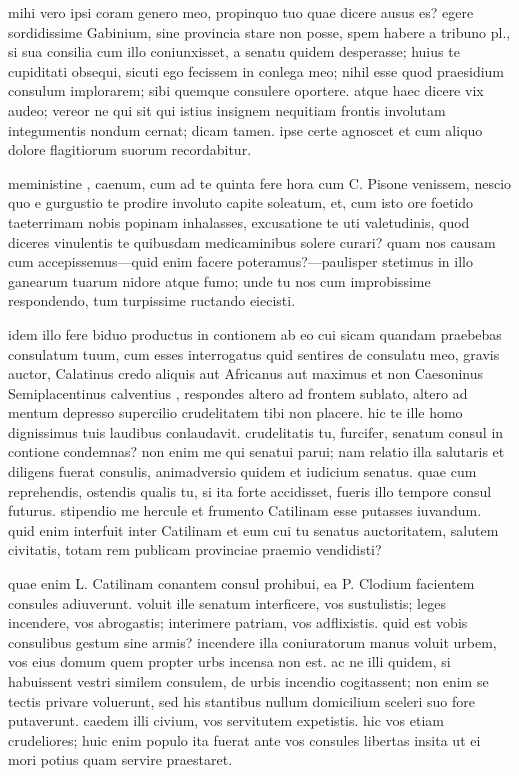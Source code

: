  mihi vero ipsi coram genero meo, propinquo tuo quae dicere ausus es? egere sordidissime Gabinium, sine provincia stare non posse, spem habere a tribuno pl., si sua consilia cum illo coniunxisset, a senatu quidem desperasse; huius te cupiditati obsequi, sicuti ego fecissem in conlega meo; nihil esse quod praesidium consulum implorarem; sibi quemque consulere oportere. atque haec dicere vix audeo; vereor ne qui sit qui istius insignem nequitiam frontis involutam integumentis nondum cernat; dicam tamen. ipse certe agnoscet et cum aliquo dolore flagitiorum suorum recordabitur.

 meministine , caenum, cum ad te quinta fere hora cum C. Pisone venissem, nescio quo e gurgustio te prodire involuto capite soleatum, et, cum isto ore foetido taeterrimam nobis popinam inhalasses, excusatione te uti valetudinis, quod diceres vinulentis te quibusdam medicaminibus solere curari? quam nos causam cum accepissemus—quid enim facere poteramus?—paulisper stetimus in illo ganearum tuarum nidore atque fumo; unde tu nos cum improbissime respondendo, tum turpissime ructando eiecisti.

 idem illo fere biduo productus in contionem ab eo cui sicam quandam praebebas consulatum tuum, cum esses interrogatus quid sentires de consulatu meo, gravis auctor, Calatinus credo aliquis aut Africanus aut maximus et non Caesoninus Semiplacentinus calventius , respondes altero ad frontem sublato, altero ad mentum depresso supercilio crudelitatem tibi non placere. hic te ille homo dignissimus tuis laudibus conlaudavit. crudelitatis tu, furcifer, senatum consul in contione condemnas? non enim me qui senatui parui; nam relatio illa salutaris et diligens fuerat consulis, animadversio quidem et iudicium senatus. quae cum reprehendis, ostendis qualis tu, si ita forte accidisset, fueris illo tempore consul futurus. stipendio me hercule et frumento Catilinam esse putasses iuvandum. quid enim interfuit inter Catilinam et eum cui tu senatus auctoritatem, salutem civitatis, totam rem publicam provinciae praemio vendidisti?

 quae enim L. Catilinam conantem consul prohibui, ea P. Clodium facientem consules adiuverunt. voluit ille senatum interficere, vos sustulistis; leges incendere, vos abrogastis; interimere patriam, vos adflixistis. quid est vobis consulibus gestum sine armis? incendere illa coniuratorum manus voluit urbem, vos eius domum quem propter urbs incensa non est. ac ne illi quidem, si habuissent vestri similem consulem, de urbis incendio cogitassent; non enim se tectis privare voluerunt, sed his stantibus nullum domicilium sceleri suo fore putaverunt. caedem illi civium, vos servitutem expetistis. hic vos etiam crudeliores; huic enim populo ita fuerat ante vos consules libertas insita ut ei mori potius quam servire praestaret.

